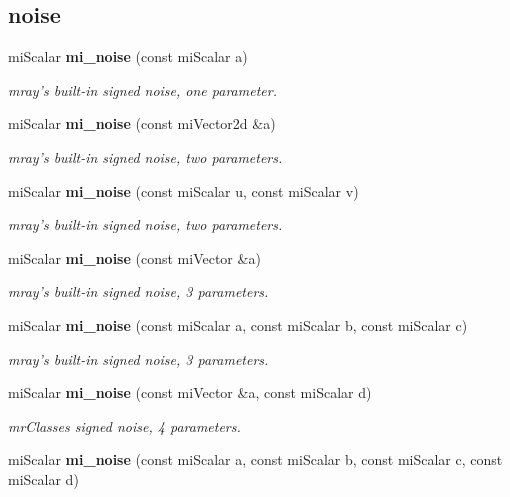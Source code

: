 \subsection*{noise}
\begin{CompactItemize}
\item 
mi\-Scalar {\bf mi\_\-noise} (const mi\-Scalar a)
\begin{CompactList}\small\item\em mray's built-in signed noise, one parameter. \item\end{CompactList}\item 
mi\-Scalar {\bf mi\_\-noise} (const mi\-Vector2d \&a)
\begin{CompactList}\small\item\em mray's built-in signed noise, two parameters. \item\end{CompactList}\item 
mi\-Scalar {\bf mi\_\-noise} (const mi\-Scalar u, const mi\-Scalar v)
\begin{CompactList}\small\item\em mray's built-in signed noise, two parameters. \item\end{CompactList}\item 
mi\-Scalar {\bf mi\_\-noise} (const mi\-Vector \&a)
\begin{CompactList}\small\item\em mray's built-in signed noise, 3 parameters. \item\end{CompactList}\item 
mi\-Scalar {\bf mi\_\-noise} (const mi\-Scalar a, const mi\-Scalar b, const mi\-Scalar c)
\begin{CompactList}\small\item\em mray's built-in signed noise, 3 parameters. \item\end{CompactList}\item 
mi\-Scalar {\bf mi\_\-noise} (const mi\-Vector \&a, const mi\-Scalar d)
\begin{CompactList}\small\item\em mr\-Classes signed noise, 4 parameters. \item\end{CompactList}\item 
mi\-Scalar {\bf mi\_\-noise} (const mi\-Scalar a, const mi\-Scalar b, const mi\-Scalar c, const mi\-Scalar d)

\end{CompactItemize}
